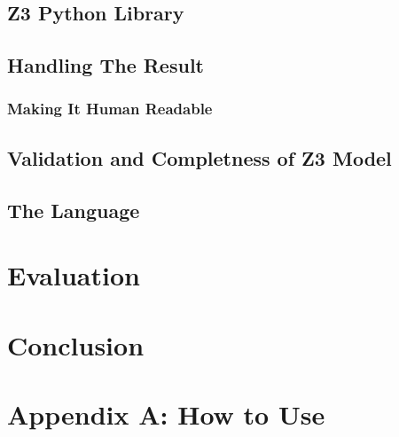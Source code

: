 \documentclass[a4paper]{report}
\begin{document}
\section{Z3 Python Library}

\section{Handling The Result}
\subsection{Making It Human Readable}

\section{Validation and Completness of Z3 Model}

\section{The Language}

\chapter{Evaluation}

\chapter{Conclusion}

\chapter{Appendix A: How to Use}


\end{document}
